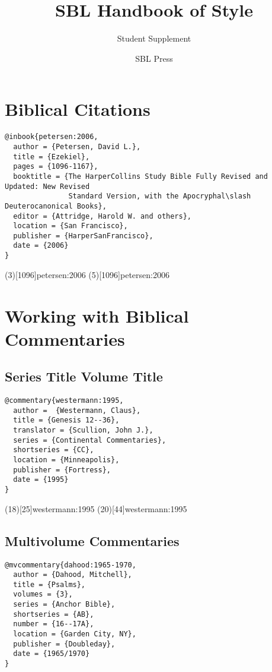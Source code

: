 \documentclass[a4paper]{article}
\begin{document}
\title{SBL Handbook of Style}
\author{Student Supplement}
\date{SBL Press}
\maketitle

\tableofcontents

\section{Biblical Citations}

\begin{verbatim}
@inbook{petersen:2006,
  author = {Petersen, David L.},
  title = {Ezekiel},
  pages = {1096-1167},
  booktitle = {The HarperCollins Study Bible Fully Revised and Updated: New Revised
               Standard Version, with the Apocryphal\slash Deuterocanonical Books},
  editor = {Attridge, Harold W. and others},
  location = {San Francisco},
  publisher = {HarperSanFrancisco},
  date = {2006}
}
\end{verbatim}

\examplecite(3)[1096]{petersen:2006}
\examplecite(5)[1096]{petersen:2006}
\examplebibliography

\section{Working with Biblical Commentaries}

\subsection{Series Title Volume Title}

\begin{verbatim}
@commentary{westermann:1995,
  author =  {Westermann, Claus},
  title = {Genesis 12--36},
  translator = {Scullion, John J.},
  series = {Continental Commentaries},
  shortseries = {CC},
  location = {Minneapolis},
  publisher = {Fortress},
  date = {1995}
}
\end{verbatim}

\examplecite(18)[25]{westermann:1995}
\examplecite(20)[44]{westermann:1995}
\exampleabbreviations
\examplebibliography

\subsection{Multivolume Commentaries}

\begin{verbatim}
@mvcommentary{dahood:1965-1970,
  author = {Dahood, Mitchell},
  title = {Psalms},
  volumes = {3},
  series = {Anchor Bible},
  shortseries = {AB},
  number = {16--17A},
  location = {Garden City, NY},
  publisher = {Doubleday},
  date = {1965/1970}
}
\end{verbatim}
\end{document}
